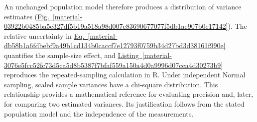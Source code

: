 \documentclass[11pt,a4paper]{article}
\begin{document}

\medskip

An unchanged population model therefore produces a distribution of variance estimates (\hyperref[material-03922b0485ba5e327df5b19a518a98d007e83690677077f5db1ae907b0e17142]{Fig.~\ref*{material-03922b0485ba5e327df5b19a518a98d007e83690677077f5db1ae907b0e17142}}). The relative uncertainty in \hyperref[material-db58b1a6fdbebf9a49b1cd134b0caccf7e12793f0759b34d27bd3d38161f990e]{Eq.~\ref*{material-db58b1a6fdbebf9a49b1cd134b0caccf7e12793f0759b34d27bd3d38161f990e}} quantifies the sample-size effect, and \hyperref[material-3076e5fcc52fc73d5ca5d8b5387f7bfaf559a150a4d0a9996d07cca4d30273b9]{Listing~\ref*{material-3076e5fcc52fc73d5ca5d8b5387f7bfaf559a150a4d0a9996d07cca4d30273b9}} reproduces the repeated-sampling calculation in R. Under independent Normal sampling, scaled sample variances have a chi-square distribution. This relationship provides a mathematical reference for evaluating precision and, later, for comparing two estimated variances. Its justification follows from the stated population model and the independence of the measurements.
\end{document}
